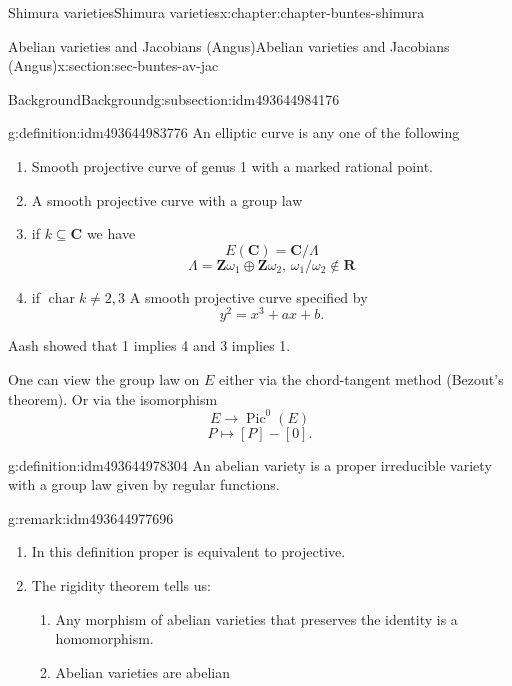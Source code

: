 \documentclass[oneside,10pt,]{book}
\numberwithin{equation}{section}
\newcommand{\ZZ}{\mathbf{Z}}
\newcommand{\RR}{\mathbf{R}}
\newcommand{\CC}{\mathbf{C}}
\DeclareMathOperator{\Pic}{Pic}
\DeclareMathOperator{\characteristic}{char}
\begin{document}
\begin{chapterptx}{Shimura varieties}{}{Shimura varieties}{}{}{x:chapter:chapter-buntes-shimura}
\begin{sectionptx}{Abelian varieties and Jacobians (Angus)}{}{Abelian varieties and Jacobians (Angus)}{}{}{x:section:sec-buntes-av-jac}
\begin{subsectionptx}{Background}{}{Background}{}{}{g:subsection:idm493644984176}
\begin{definition}{}{g:definition:idm493644983776}%
An elliptic curve is any one of the following%
\begin{enumerate}
\item{}Smooth projective curve of genus 1 with  a marked rational point.%
\item{}A smooth projective curve with a group law%
\item{}if \(k \subseteq \CC\) we have%
\begin{equation*}
E(\CC) = \CC/ \Lambda
\end{equation*}
%
\begin{equation*}
\Lambda = \ZZ \omega_1 \oplus \ZZ \omega_2,\, \omega_1/\omega_2 \not\in \RR
\end{equation*}
%
\item{}if \(\characteristic k \ne 2,3\) A smooth projective curve specified by%
\begin{equation*}
y^2=  x^3+ ax + b\text{.}
\end{equation*}
%
\end{enumerate}
%
\end{definition}
Aash showed that 1 implies 4 and 3 implies 1.%
\par
One can view the group law on \(E\) either via the chord-tangent method (Bezout's theorem). Or via the isomorphism%
\begin{equation*}
E \to \Pic^0(E)
\end{equation*}
%
\begin{equation*}
P \mapsto [P] - [0]\text{.}
\end{equation*}
%
\begin{definition}{}{g:definition:idm493644978304}%
An abelian variety is a proper irreducible variety with a group law given by regular functions.%
\end{definition}
\begin{remark}{}{g:remark:idm493644977696}%
%
\begin{enumerate}
\item{}In this definition proper is equivalent to projective.%
\item{}The rigidity theorem tells us:%
\begin{enumerate}
\item{}Any morphism of abelian varieties that preserves the identity is a homomorphism.%
\item{}Abelian varieties are abelian%
\end{enumerate}
%
\end{enumerate}

\end{remark}
\end{subsectionptx}
\end{sectionptx}
\end{chapterptx}
\end{document}

